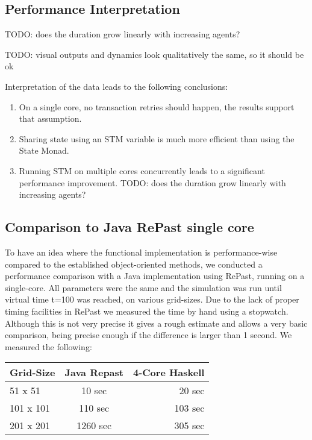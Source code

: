 \subsection{Performance Interpretation}
TODO: does the duration grow linearly with increasing agents?

TODO: visual outputs and dynamics look qualitatively the same, so it should be ok

Interpretation of the data leads to the following conclusions:
\begin{enumerate}
	\item On a single core, no transaction retries should happen, the results support that assumption.
	\item Sharing state using an STM variable is much more efficient than using the State Monad.
	\item Running STM on multiple cores concurrently leads to a significant performance improvement. TODO: does the duration grow linearly with increasing agents?
\end{enumerate}

\subsection{Comparison to Java RePast single core}
To have an idea where the functional implementation is performance-wise compared to the established object-oriented methods, we conducted a performance comparison with a Java implementation using RePast, running on a single-core. All parameters were the same and the simulation was run until virtual time t=100 was reached, on various grid-sizes. Due to the lack of proper timing facilities in RePast we measured the time by hand using a stopwatch. Although this is not very precise it gives a rough estimate and allows a very basic comparison, being precise enough if the difference is larger than 1 second. We measured the following:

\begin{center}
  \begin{tabular}{ l || c | r }
    Grid-Size & Java Repast & 4-Core Haskell \\ \hline \hline 
    51 x 51 & 10 sec & 20 sec \\ \hline
    101 x 101 & 110 sec & 103 sec \\ \hline
    201 x 201 & 1260 sec & 305 sec \\ \hline
  \end{tabular}
\end{center}

